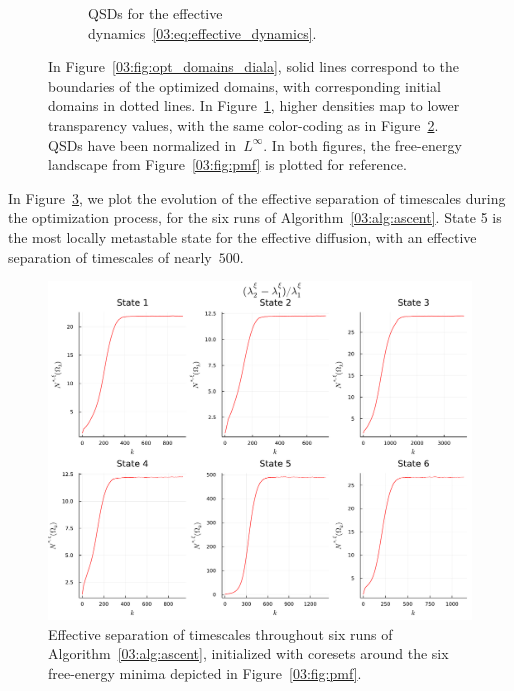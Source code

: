 \begin{figure}
\begin{subfigure}{0.5\linewidth}
            \caption[]{QSDs for the effective dynamics~\eqref{03:eq:effective_dynamics}. }
            \label{03:fig:eff_qsds}
        \end{subfigure}
        \caption[]{In Figure~\ref{03:fig:opt_domains_diala}, solid lines correspond to the boundaries of the optimized domains, with corresponding initial domains in dotted lines. In Figure~\ref{03:fig:eff_qsds}, higher densities map to lower transparency values, with the same color-coding as in Figure~\ref{03:fig:opt_domains}. QSDs have been normalized in~$L^\infty$. In both figures, the free-energy landscape from Figure~\ref{03:fig:pmf} is plotted for reference.}
        \label{03:fig:opt_domains}
\end{figure}

In Figure~\ref{03:fig:obj_conv_diala}, we plot the evolution of the effective separation of timescales during the optimization process, for the six runs of Algorithm~\ref{03:alg:ascent}. State 5 is the most locally metastable state for the effective diffusion, with an effective separation of timescales of nearly~$500$. 
\begin{figure}
    \center
    \includegraphics[width=1\linewidth]{figures/03/shape_optim_diala/obj.pdf}
    \caption[]{Effective separation of timescales throughout six runs of Algorithm~\ref{03:alg:ascent}, initialized with coresets around the six free-energy minima depicted in Figure~\ref{03:fig:pmf}.}
    \label{03:fig:obj_conv_diala}
\end{figure}

